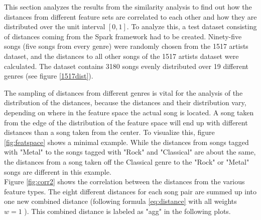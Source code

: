 This section analyzes the results from the similarity analysis to find out how the distances from different feature sets are correlated to each other and how they are distributed over the unit interval $[0,1]$.
\noindent To analyze this, a test dataset consisting of distances coming from the Spark framework had to be created. Ninety-five songs (five songs from every genre) were randomly chosen from the 1517 artists dataset, and the distances to all other songs of the 1517 artists dataset were calculated. The dataset contains 3180 songs evenly distributed over 19 different genres (see figure \ref{1517dist}).
\begin{figure}[htbp]
	\centering
\end{figure}%
\FloatBarrier

\noindent The sampling of distances from different genres is vital for the analysis of the distribution of the distances, because the distances and their distribution vary, depending on where in the feature space the actual song is located. 
\noindent A song taken from the edge of the distribution of the feature space will end up with different distances than a song taken from the center. To visualize this, figure \ref{fig:featspace} shows a minimal example. While the distances from songs tagged with "Metal" to the songs tagged with "Rock" and "Classical" are about the same, the distances from a song taken off the Classical genre to the "Rock" or "Metal" songs are different in this example.\\ 
\noindent Figure \ref{fig:corr2} shows the correlation between the distances from the various feature types. The eight different distances for each song pair are summed up into one new combined distance (following formula \ref{eq:distance} with all weights $w = 1$ ). This combined distance is labeled as "agg" in the following plots.

